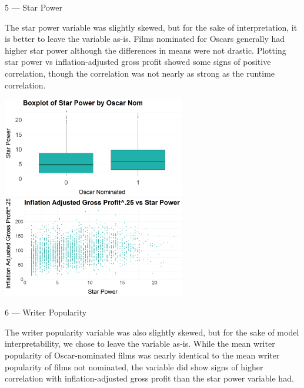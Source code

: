\documentclass[10pt]{article}
\begin{document}


5 --- Star Power

The star power variable was slightly skewed, but for the sake of interpretation, it is better to leave the variable as-is. Films nominated for Oscars generally had higher star power although the differences in means were not drastic. Plotting star power vs inflation-adjusted gross profit showed some signs of positive correlation, though the correlation was not nearly as strong as the runtime correlation.

\begin{center}
\includegraphics[width=8cm]{_assets/_eda/star_power_on.png}
\hspace{1cm}
\includegraphics[width=8cm]{_assets/_eda/star_power_iagp.png}
\end{center}

6 --- Writer Popularity

The writer popularity variable was also slightly skewed, but for the sake of model interpretability, we chose to leave the variable as-is. While the mean writer popularity of Oscar-nominated films was nearly identical to the mean writer popularity of films not nominated, the variable did show signs of higher correlation with inflation-adjusted gross profit than the star power variable had.
\end{document}
